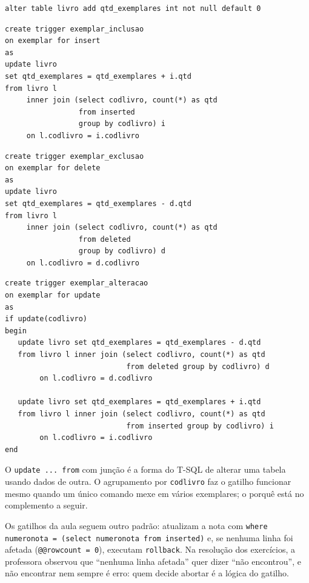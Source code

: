 \begin{lstlisting}
alter table livro add qtd_exemplares int not null default 0
\end{lstlisting}

\begin{lstlisting}[caption={Inclusão: soma os exemplares novos de cada livro.}]
create trigger exemplar_inclusao
on exemplar for insert
as
update livro
set qtd_exemplares = qtd_exemplares + i.qtd
from livro l
     inner join (select codlivro, count(*) as qtd
                 from inserted
                 group by codlivro) i
     on l.codlivro = i.codlivro
\end{lstlisting}

\begin{lstlisting}[caption={Exclusão: desconta os exemplares removidos.}]
create trigger exemplar_exclusao
on exemplar for delete
as
update livro
set qtd_exemplares = qtd_exemplares - d.qtd
from livro l
     inner join (select codlivro, count(*) as qtd
                 from deleted
                 group by codlivro) d
     on l.codlivro = d.codlivro
\end{lstlisting}

\begin{lstlisting}[caption={Alteração: só age se o exemplar mudou de livro.}]
create trigger exemplar_alteracao
on exemplar for update
as
if update(codlivro)
begin
   update livro set qtd_exemplares = qtd_exemplares - d.qtd
   from livro l inner join (select codlivro, count(*) as qtd
                            from deleted group by codlivro) d
        on l.codlivro = d.codlivro

   update livro set qtd_exemplares = qtd_exemplares + i.qtd
   from livro l inner join (select codlivro, count(*) as qtd
                            from inserted group by codlivro) i
        on l.codlivro = i.codlivro
end
\end{lstlisting}

O \texttt{update ... from} com junção é a forma do T-SQL de alterar uma
tabela usando dados de outra. O agrupamento por \texttt{codlivro} faz o
gatilho funcionar mesmo quando um único comando mexe em vários
exemplares; o porquê está no complemento a seguir.

Os gatilhos da aula seguem outro padrão: atualizam a nota com
\texttt{where numeronota = (select numeronota from inserted)} e, se
nenhuma linha foi afetada (\texttt{@@rowcount = 0}), executam
\texttt{rollback}. Na resolução dos exercícios, a professora observou
que ``nenhuma linha afetada'' quer dizer ``não encontrou'', e não
encontrar nem sempre é erro: quem decide abortar é a lógica do
gatilho.


